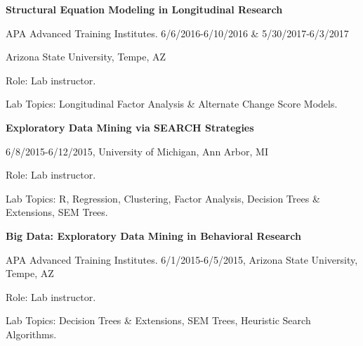\documentclass[letterpaper,10pt]{article}
\begin{document}
\begin{itemize}
%
\begin{center}
	\parbox{6.5in}{\textbf{Structural Equation Modeling in Longitudinal Research}}
	\parbox{6.5in}{APA Advanced Training Institutes. 6/6/2016-6/10/2016 \& 5/30/2017-6/3/2017}
		\parbox{6.5in}{Arizona State University, Tempe, AZ}
	\parbox{6.5in}{Role: Lab instructor.}
	\parbox{6.5in}{Lab Topics: Longitudinal Factor Analysis \& Alternate Change Score Models.}
\end{center}

%
\begin{center}
	\parbox{6.5in}{\textbf{Exploratory Data Mining via SEARCH Strategies}}
	\parbox{6.5in}{6/8/2015-6/12/2015, University of Michigan, Ann Arbor, MI}
	\parbox{6.5in}{Role: Lab instructor.}
	\parbox{6.5in}{Lab Topics: R, Regression, Clustering, Factor Analysis, Decision Trees \& Extensions, SEM Trees.}
\end{center}

%
\begin{center}
	\parbox{6.5in}{\textbf{Big Data: Exploratory Data Mining in Behavioral Research}}
	\parbox{6.5in}{APA Advanced Training Institutes. 6/1/2015-6/5/2015, Arizona State University, Tempe, AZ}
	\parbox{6.5in}{Role: Lab instructor.}
	\parbox{6.5in}{Lab Topics: Decision Trees \& Extensions, SEM Trees, Heuristic Search Algorithms.}
\end{center}





\end{itemize}
\end{document}
